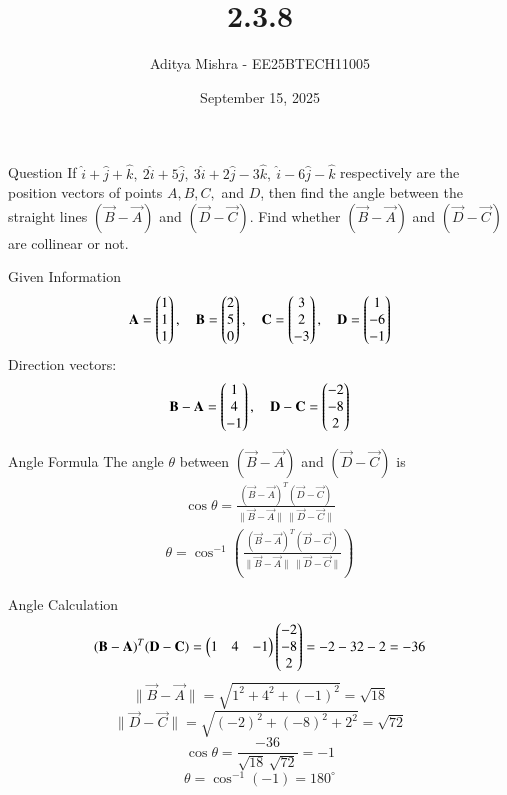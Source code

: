 \documentclass{beamer}
\title{2.3.8}
\author{Aditya Mishra - EE25BTECH11005}
\date{September 15, 2025}
\begin{document}
\frame{\titlepage}

\begin{frame}{Question}
If $\hat{i} + \hat{j} + \hat{k},\ 2\hat{i} + 5\hat{j},\ 3\hat{i} + 2\hat{j} - 3\hat{k},\ \hat{i} - 6\hat{j} - \hat{k}$ respectively are the position vectors of points $A, B, C,$ and $D$, then find the angle between the straight lines $(\vec{B}-\vec{A})$ and $(\vec{D}-\vec{C})$. Find whether $(\vec{B}-\vec{A})$ and $(\vec{D}-\vec{C})$ are collinear or not.
\end{frame}

\begin{frame}{Given Information}
\[
\mathbf{A} = \begin{pmatrix}1\\1\\1\end{pmatrix},\quad
\mathbf{B} = \begin{pmatrix}2\\5\\0\end{pmatrix},\quad
\mathbf{C} = \begin{pmatrix}3\\2\\-3\end{pmatrix},\quad
\mathbf{D} = \begin{pmatrix}1\\-6\\-1\end{pmatrix}
\]
Direction vectors:
\[
\mathbf{B}-\mathbf{A} = \begin{pmatrix}1\\4\\-1\end{pmatrix}, \quad
\mathbf{D}-\mathbf{C} = \begin{pmatrix}-2\\-8\\2\end{pmatrix}
\]
\end{frame}

\begin{frame}{Angle Formula}
The angle $\theta$ between $(\vec{B}-\vec{A})$ and $(\vec{D}-\vec{C})$ is
\begin{align}
\cos \theta = \frac{(\vec{B}-\vec{A})^T (\vec{D}-\vec{C})}
{\|\vec{B}-\vec{A}\| \, \|\vec{D}-\vec{C}\|}
\end{align}
\begin{align}
\theta = \cos^{-1}\left(
\frac{(\vec{B}-\vec{A})^T (\vec{D}-\vec{C})}
{\|\vec{B}-\vec{A}\| \, \|\vec{D}-\vec{C}\|}\right)
\end{align}
\end{frame}

\begin{frame}{Angle Calculation}
\[
(\mathbf{B}-\mathbf{A})^T (\mathbf{D}-\mathbf{C})
= \begin{pmatrix}1 & 4 & -1\end{pmatrix}\begin{pmatrix}-2 \\ -8 \\ 2\end{pmatrix}
= -2 - 32 - 2 = -36
\]
\[
\|\vec{B}-\vec{A}\| = \sqrt{1^2 + 4^2 + (-1)^2} = \sqrt{18}
\]
\[
\|\vec{D}-\vec{C}\| = \sqrt{(-2)^2 + (-8)^2 + 2^2} = \sqrt{72}
\]
\[
\cos\theta = \frac{-36}{\sqrt{18}\,\sqrt{72}} = -1
\]
\[
\theta = \cos^{-1}(-1) = 180^\circ
\]
\end{frame}
\end{document}
